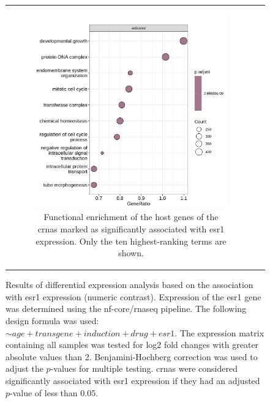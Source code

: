 \begin{figure}[H]
\begin{tabular}{cc}
\begin{subfigure}{0.5\textwidth}
            \includegraphics[width=\linewidth]{chapters/4_results_and_discussion/figures/dea/deseq2/esr1/dot.png}
            \caption{Functional enrichment of the host genes of the
                \glspl{crna} marked as significantly associated with \gls{esr1}
                expression.
                Only the ten highest-ranking terms are shown.
            }

            \label{fig:esr1_go_terms}
        \end{subfigure}
    \end{tabular}
    \caption{Results of differential expression analysis based on the
        association with \gls{esr1} expression (numeric contrast).
        Expression of the \gls{esr1} gene was determined using the nf-core/rnaseq
        pipeline\supercite{patel_nf-corernaseq_2024}.
        The following design formula was used: $\sim age + transgene + induction + drug
            + esr1$.
        The expression matrix containing all samples was tested for log2 fold changes
        with greater absolute values than 2.
        Benjamini-Hochberg correction\supercite{benjamini_controlling_1995} was used to
        adjust the $p$-values for multiple testing.
        \Glspl{crna} were considered significantly associated with \gls{esr1}
        expression if they had an adjusted $p$-value of less than 0.05.
    }
    \label{fig:dea_esr1}
\end{figure}

